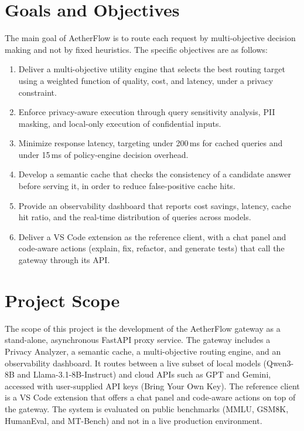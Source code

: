 \section{Goals and Objectives}
\label{sec:goals}

The main goal of AetherFlow is to route each request by multi-objective decision making and not by fixed heuristics. The specific objectives are as follows:

\begin{enumerate}
    \item Deliver a multi-objective utility engine that selects the best routing target using a weighted function of quality, cost, and latency, under a privacy constraint.
    \item Enforce privacy-aware execution through query sensitivity analysis, PII masking, and local-only execution of confidential inputs.
    \item Minimize response latency, targeting under 200\,ms for cached queries and under 15\,ms of policy-engine decision overhead.
    \item Develop a semantic cache that checks the consistency of a candidate answer before serving it, in order to reduce false-positive cache hits.
    \item Provide an observability dashboard that reports cost savings, latency, cache hit ratio, and the real-time distribution of queries across models.
    \item Deliver a VS Code extension as the reference client, with a chat panel and code-aware actions (explain, fix, refactor, and generate tests) that call the gateway through its API.
\end{enumerate}

\section{Project Scope}
\label{sec:scope}

The scope of this project is the development of the AetherFlow gateway as a stand-alone, asynchronous FastAPI proxy service. The gateway includes a Privacy Analyzer, a semantic cache, a multi-objective routing engine, and an observability dashboard. It routes between a live subset of local models (Qwen3-8B and Llama-3.1-8B-Instruct) and cloud APIs such as GPT and Gemini, accessed with user-supplied API keys (Bring Your Own Key). The reference client is a VS Code extension that offers a chat panel and code-aware actions on top of the gateway. The system is evaluated on public benchmarks (MMLU, GSM8K, HumanEval, and MT-Bench) and not in a live production environment.

